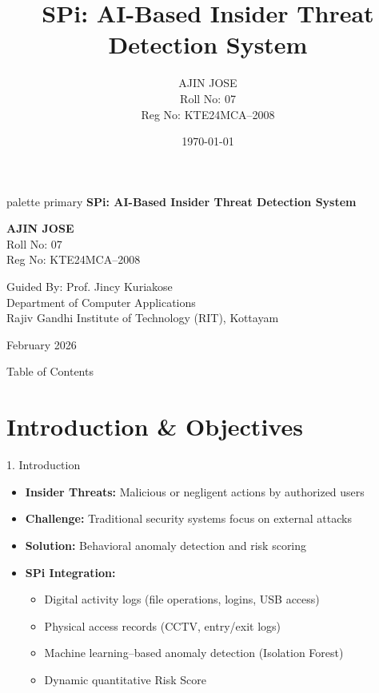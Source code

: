\documentclass[aspectratio=169]{beamer}
\title{SPi: AI-Based Insider Threat Detection System}
\author{AJIN JOSE \\ Roll No: 07 \\ Reg No: KTE24MCA--2008}
\institute{Rajiv Gandhi Institute of Technology (RIT), Kottayam \\ Department of Computer Applications}
\date{\today}
\begin{document}

\begin{frame}[plain]
\centering
\vspace{0.5cm}
\begin{beamercolorbox}[sep=12pt,center,shadow=true,rounded=true]{palette primary}
\fontsize{18pt}{20pt}\selectfont 
\textbf{SPi: AI-Based Insider Threat Detection System}
\end{beamercolorbox}

\vspace{1.5cm}
{\Large \textbf{AJIN JOSE}}\\[0.3cm]
{\normalsize Roll No: 07}\\
{\normalsize Reg No: KTE24MCA--2008}

\vspace{1cm}
{\small Guided By: Prof. Jincy Kuriakose}\\
{\small Department of Computer Applications}\\
{\small Rajiv Gandhi Institute of Technology (RIT), Kottayam}

\vspace{1.5cm}
{\tiny February 2026}
\end{frame}


\begin{frame}{Table of Contents}
\tableofcontents
\end{frame}


\section{Introduction \& Objectives}

\begin{frame}{1. Introduction}

\begin{itemize}
    \item \textbf{Insider Threats:} Malicious or negligent actions by authorized users
    \item \textbf{Challenge:} Traditional security systems focus on external attacks
    \item \textbf{Solution:} Behavioral anomaly detection and risk scoring
    \vspace{0.3cm}
    \item \textbf{SPi Integration:}
    \begin{itemize}
        \item Digital activity logs (file operations, logins, USB access)
        \item Physical access records (CCTV, entry/exit logs)
        \item Machine learning–based anomaly detection (Isolation Forest)
        \item Dynamic quantitative Risk Score
    \end{itemize}
\end{itemize}

\end{frame}
\end{document}
